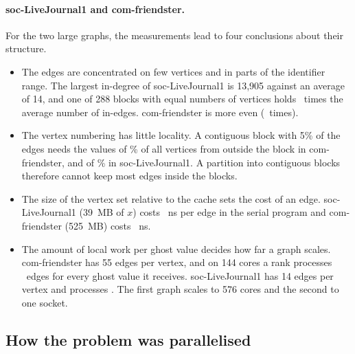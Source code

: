 \documentclass[11pt,a4paper]{article}
\begin{document}
\paragraph{soc-LiveJournal1 and com-friendster.} For the two large graphs, the measurements lead to four
conclusions about their structure.
\begin{itemize}
\item The edges are concentrated on few vertices and in parts of the identifier range. The largest in-degree of
  soc-LiveJournal1 is 13,905 against an average of 14, and one of 288 blocks with equal numbers of vertices holds
  \dzLJimbV\ times the average number of in-edges. com-friendster is more even (\dzFRimbV\ times).
\item The vertex numbering has little locality. A contiguous block with 5\% of the edges needs the values of
  \cmFRghostFrac\% of all vertices from outside the block in com-friendster, and of \cmLJghostFrac\% in
  soc-LiveJournal1. A partition into
  contiguous blocks therefore cannot keep most edges inside the blocks.
\item The size of the vertex set relative to the cache sets the cost of an edge. soc-LiveJournal1 (39~MB of $x$)
  costs \serLJns~ns per edge in the serial program and com-friendster (525~MB) costs \serFRns~ns.
\item The amount of local work per ghost value decides how far a graph scales. com-friendster has 55 edges per
  vertex, and on 144 cores a rank processes \cmFRedgesPerGhost\ edges for every ghost value it receives.
  soc-LiveJournal1 has 14 edges per vertex and processes \cmLJedgesPerGhost. The first graph scales to 576 cores and
  the second to one socket.
\end{itemize}

\subsection{How the problem was parallelised}
\end{document}
